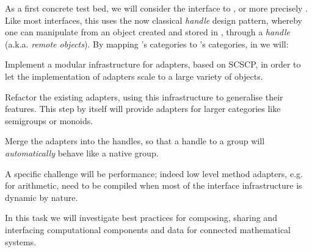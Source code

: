 \begin{workpackage}[id=component-architecture,wphases=0-48!.5,
  title=Component Architecture,lead=UV,
  PSRM=50,UVRM=8,SARM=16, USORM=6, UORM=4, LLRM=14, UJFRM=6, UGRM=14]
\begin{tasklist}
\begin{task}[title=Interfaces between systems,id=interface-systems,lead=PS,PM=22,partners={UV,UO,SA,UG},wphases=0-36]
    As a first concrete test bed, we will consider the \Sage interface
    to \GAP, or more precisely \libGAP.  Like most \Sage interfaces,
    this uses the now classical \emph{handle} design pattern, whereby
    one can manipulate from \Sage an object created and stored in
    \GAP, through a \emph{handle} (a.k.a. \emph{remote objects}).  By
    mapping \GAP's categories to \Sage's categories, in
     we
    will:
    \begin{compactitem}
    \item Implement a modular infrastructure for adapters, based on
      SCSCP, in order to let the implementation of adapters scale to a
      large variety of objects.
    \item Refactor the existing adapters, using this infrastructure to
      generalise their features. This step by itself will provide
      adapters for larger categories like semigroups or monoids.
    \item Merge the adapters into the handles, so that a handle to a
      \GAP group will \emph{automatically} behave like a native \Sage
      group.
    \end{compactitem}
    A specific challenge will be performance; indeed low level method
    adapters, e.g. for arithmetic, need to be compiled when most of
    the interface infrastructure is dynamic by nature.

  \end{task}

  \begin{task}[title=Modularisation and packaging,id=mod-packaging,lead=UV,PM=20,partners={PS,LL,UG},wphases=0-48]
    In this task we will investigate best practices for composing,
    sharing and interfacing computational components and data for
    connected mathematical systems.


\end{task}
\end{tasklist}
\end{workpackage}
